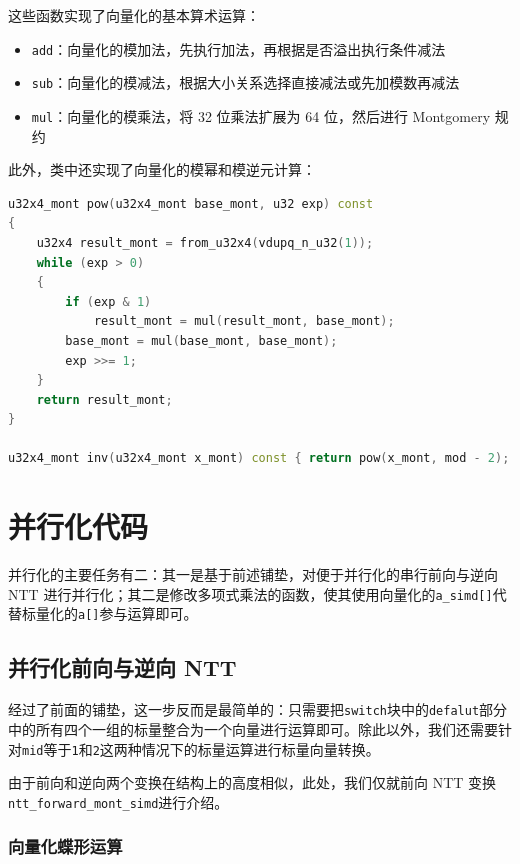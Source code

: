 \documentclass[a4paper]{article}
\begin{document}
这些函数实现了向量化的基本算术运算：

\begin{itemize}
    \item \texttt{add}：向量化的模加法，先执行加法，再根据是否溢出执行条件减法
    \item \texttt{sub}：向量化的模减法，根据大小关系选择直接减法或先加模数再减法
    \item \texttt{mul}：向量化的模乘法，将 32 位乘法扩展为 64 位，然后进行 Montgomery 规约
\end{itemize}

此外，类中还实现了向量化的模幂和模逆元计算：

\begin{lstlisting}[language=C++]
u32x4_mont pow(u32x4_mont base_mont, u32 exp) const
{
    u32x4 result_mont = from_u32x4(vdupq_n_u32(1));
    while (exp > 0)
    {
        if (exp & 1)
            result_mont = mul(result_mont, base_mont);
        base_mont = mul(base_mont, base_mont);
        exp >>= 1;
    }
    return result_mont;
}

u32x4_mont inv(u32x4_mont x_mont) const { return pow(x_mont, mod - 2); }
\end{lstlisting}

\section{并行化代码}

并行化的主要任务有二：其一是基于前述铺垫，对便于并行化的串行前向与逆向 NTT 进行并行化；其二是修改多项式乘法的函数，使其使用向量化的\texttt{a\_simd[]}代替标量化的\texttt{a[]}参与运算即可。

\subsection{并行化前向与逆向 NTT}

经过了前面的铺垫，这一步反而是最简单的：只需要把\texttt{switch}块中的\texttt{defalut}部分中的所有四个一组的标量整合为一个向量进行运算即可。除此以外，我们还需要针对\texttt{mid}等于\texttt{1}和\texttt{2}这两种情况下的标量运算进行标量向量转换。

由于前向和逆向两个变换在结构上的高度相似，此处，我们仅就前向 NTT 变换\texttt{ntt\_forward\_mont\_simd}进行介绍。

\subsubsection{向量化蝶形运算}
\end{document}
